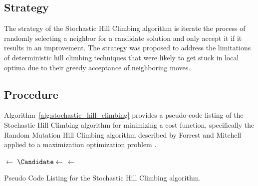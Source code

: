 \subsection{Strategy}
The strategy of the Stochastic Hill Climbing algorithm is iterate the process of randomly selecting a neighbor for a candidate solution and only accept it if it results in an improvement.
The strategy was proposed to address the limitations of deterministic hill climbing techniques that were likely to get stuck in local optima due to their greedy acceptance of neighboring moves.

\subsection{Procedure}
Algorithm~\ref{alg:stochastic_hill_climbing} provides a pseudo-code listing of the Stochastic Hill Climbing algorithm for minimizing a cost function, specifically the Random Mutation Hill Climbing algorithm described by Forrest and Mitchell applied to a maximization optimization problem \cite{Forrest1993}.

\begin{algorithm}[h]
	\SetLine
	\KwIn{\NumIterations, \ProblemSize}
	\KwOut{\Current}
	\Current $\leftarrow$ \RandomSolution{\ProblemSize}\;
	 {
		$\Candidate \leftarrow$ \RandomNeighbor{\Current}\;		
		\If{\Cost{\Candidate} $\geq$ \Cost{\Current}} {
			\Current $\leftarrow$ \Candidate\;
		}
	}
	\Return{\Current}\;
	\caption{Pseudo Code Listing for the Stochastic Hill Climbing algorithm.}
	\label{alg:stochastic_hill_climbing}
\end{algorithm}

